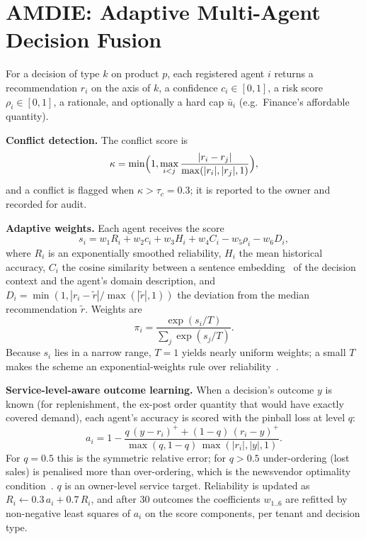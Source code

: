 \documentclass[conference]{IEEEtran}
\begin{document}
\section{AMDIE: Adaptive Multi-Agent Decision Fusion}
For a decision of type $k$ on product $p$, each registered agent $i$ returns a recommendation $r_i$ on the axis of $k$, a confidence $c_i\in[0,1]$, a risk score $\rho_i\in[0,1]$, a rationale, and optionally a hard cap $\bar u_i$ (e.g.\ Finance's affordable quantity).

\textbf{Conflict detection.} The conflict score is
\begin{equation}
\kappa=\min\Bigl(1,\max_{i<j}\frac{|r_i-r_j|}{\max(|r_i|,|r_j|,1)}\Bigr),
\end{equation}
and a conflict is flagged when $\kappa>\tau_c=0.3$; it is reported to the owner and recorded for audit.

\textbf{Adaptive weights.} Each agent receives the score
\begin{equation}
s_i = w_1R_i + w_2c_i + w_3H_i + w_4C_i - w_5\rho_i - w_6D_i,
\end{equation}
where $R_i$ is an exponentially smoothed reliability, $H_i$ the mean historical accuracy, $C_i$ the cosine similarity between a sentence embedding~\cite{reimers2019} of the decision context and the agent's domain description, and $D_i=\min(1,|r_i-\tilde r|/\max(|\tilde r|,1))$ the deviation from the median recommendation $\tilde r$. Weights are
\begin{equation}
\pi_i=\frac{\exp(s_i/T)}{\sum_j\exp(s_j/T)}.
\end{equation}
Because $s_i$ lies in a narrow range, $T=1$ yields nearly uniform weights; a small $T$ makes the scheme an exponential-weights rule over reliability~\cite{freund1997}.

\textbf{Service-level-aware outcome learning.} When a decision's outcome $y$ is known (for replenishment, the ex-post order quantity that would have exactly covered demand), each agent's accuracy is scored with the pinball loss at level $q$:
\begin{equation}
a_i=1-\frac{q\,(y-r_i)^+ + (1-q)\,(r_i-y)^+}{\max(q,1-q)\,\max(|r_i|,|y|,1)} .
\end{equation}
For $q=0.5$ this is the symmetric relative error; for $q>0.5$ under-ordering (lost sales) is penalised more than over-ordering, which is the newsvendor optimality condition~\cite{koenker1978,zipkin2000}. $q$ is an owner-level service target. Reliability is updated as $R_i\leftarrow 0.3\,a_i+0.7\,R_i$, and after 30 outcomes the coefficients $w_{1..6}$ are refitted by non-negative least squares of $a_i$ on the score components, per tenant and decision type.
\end{document}
